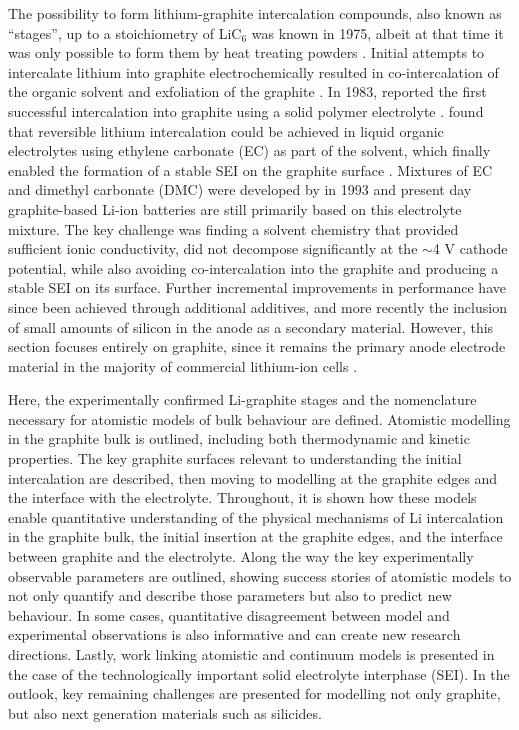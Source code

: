 \documentclass[../main.tex]{subfiles}
\begin{document}
The possibility to form lithium-graphite intercalation compounds, also known as ``stages'', up to a stoichiometry of LiC$_{6}$ was known in 1975, albeit at that time it was only possible to form them by heat treating powders \cite{GUERARD1975337,Woo1983,BASU1979275}. Initial attempts to intercalate lithium into graphite electrochemically resulted in co-intercalation of the organic solvent and exfoliation of the graphite \cite{besenhard1976electrochemical}. In 1983, \citeauthor{yazami1983} reported the first successful intercalation into graphite using a solid polymer electrolyte \cite{yazami1983}. \citeauthor{Fong1990} found that reversible lithium intercalation could be achieved in liquid organic electrolytes using ethylene carbonate (EC) as part of the solvent, which finally enabled the formation of a stable SEI on the graphite surface \cite{Fong1990}. Mixtures of EC and dimethyl carbonate (DMC) were developed by \citeauthor{TARASCON19931221} in 1993 \cite{TARASCON19931221} and present day graphite-based Li-ion batteries are still primarily based on this electrolyte mixture. The key challenge was finding a solvent chemistry that provided sufficient ionic conductivity, did not decompose significantly at the $\sim$4 V cathode potential, while also avoiding co-intercalation into the graphite and producing a stable SEI on its surface. Further incremental improvements in performance have since been achieved through additional additives, and more recently the inclusion of small amounts of silicon in the anode as a secondary material. However, this section focuses entirely on graphite, since it remains the primary anode electrode material in the majority of commercial lithium-ion cells \cite{asenbauer_success_2020}.

Here, the experimentally confirmed Li-graphite stages and the nomenclature necessary for atomistic models of bulk behaviour are defined. Atomistic modelling in the graphite bulk is outlined, including both thermodynamic and kinetic properties. The key graphite surfaces relevant to understanding the initial intercalation are described, then moving to modelling at the graphite edges and the interface with the electrolyte. Throughout, it is shown how these models enable quantitative understanding of the physical mechanisms of Li intercalation in the graphite bulk, the initial insertion at the graphite edges, and the interface between graphite and the electrolyte. Along the way the key experimentally observable parameters are outlined, showing success stories of atomistic models to not only quantify and describe those parameters but also to predict new behaviour. In some cases, quantitative disagreement between model and experimental observations is also informative and can create new research directions. Lastly, work linking atomistic and continuum models is presented in the case of the technologically important solid electrolyte interphase (SEI). In the outlook, key remaining challenges are presented for modelling not only graphite, but also next generation materials such as silicides.  
\end{document}
